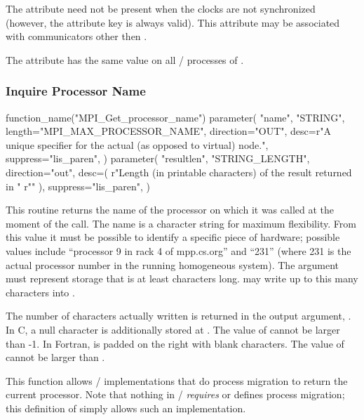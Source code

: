 The attribute  need not be present when
the clocks are not synchronized (however, the attribute key
 is always valid).
This attribute
may be associated with communicators other then .

The attribute  has the same value on all
\mpi/ processes of .

\subsubsection{Inquire Processor Name}
\begin{mpi-binding}
    function_name("MPI_Get_processor_name")
    parameter(
        "name",
        "STRING",
        length="MPI_MAX_PROCESSOR_NAME",
        direction="OUT",
        desc=r"A unique specifier for the actual (as opposed to virtual) node.",
        suppress="lis_paren",
    )
    parameter(
        "resultlen",
        "STRING_LENGTH",
        direction="out",
        desc=(
            r"Length (in printable characters) of the result returned in "
            r""
        ),
        suppress="lis_paren",
    )
\end{mpi-binding}

This routine returns the name of the processor on which it was called at the
moment of the call.
The name is a character string for maximum flexibility.  From
this value it must be possible to identify a specific piece of hardware;
possible values include ``processor 9 in rack 4 of mpp.cs.org'' and ``231''
(where 231 is the actual processor number in the running homogeneous system).
The argument  must represent storage that is at least
 characters long.
 may write up to this many characters into
.

The number of characters actually written
is returned in the output argument, .
In C, a null character is additionally stored at .
The value of  cannot be larger than -1.
In Fortran,  is padded on the right with blank characters.
The value of  cannot be larger than .

\begin{rationale}
This function allows \MPI/ implementations that do process
migration to return the current processor.  Note that nothing in \MPI/ 
\emph{requires} or defines process migration; this definition of
 simply allows such an implementation.
\end{rationale}

